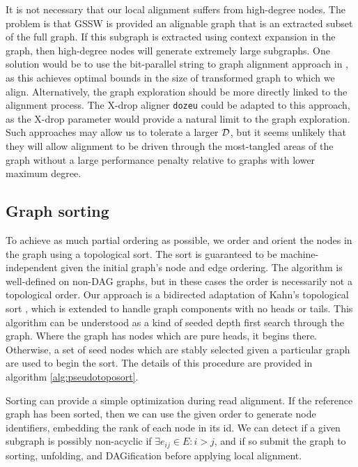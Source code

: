 It is not necessary that our local alignment suffers from high-degree nodes.
The problem is that GSSW is provided an alignable graph that is an extracted subset of the full graph.
If this subgraph is extracted using context expansion in the graph, then high-degree nodes will generate extremely large subgraphs.
One solution would be to use the bit-parallel string to graph alignment approach in \cite{rautiainen2018bit}, as this achieves optimal bounds in the size of transformed graph to which we align.
Alternatively, the graph exploration should be more directly linked to the alignment process.
The X-drop aligner {\tt dozeu} could be adapted to this approach, as the X-drop parameter would provide a natural limit to the graph exploration.
Such approaches may allow us to tolerate a larger ${\cal D}$, but it seems unlikely that they will allow alignment to be driven through the most-tangled areas of the graph without a large performance penalty relative to graphs with lower maximum degree.

\subsection{Graph sorting}

To achieve as much partial ordering as possible, we order and orient the nodes in the graph using a topological sort.
The sort is guaranteed to be machine-independent given the initial graph's node and edge ordering.
The algorithm is well-defined on non-DAG graphs, but in these cases the order is necessarily not a topological order.
Our approach is a bidirected adaptation of Kahn's topological sort \cite{kahn1962topological}, which is extended to handle graph components with no heads or tails.
This algorithm can be understood as a kind of seeded depth first search through the graph.
Where the graph has nodes which are pure heads, it begins there.
Otherwise, a set of seed nodes which are stably selected given a particular graph are used to begin the sort.
The details of this procedure are provided in algorithm \ref{alg:pseudotoposort}.

Sorting can provide a simple optimization during read alignment.
If the reference graph has been sorted, then we can use the given order to generate node identifiers, embedding the rank of each node in its id.
We can detect if a given subgraph is possibly non-acyclic if $\exists e_{ij} \in E : i > j$, and if so submit the graph to sorting, unfolding, and DAGification before applying local alignment.

